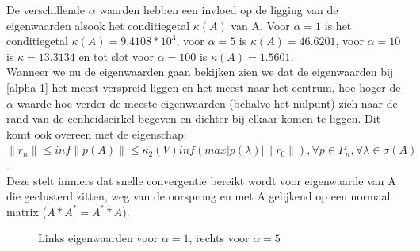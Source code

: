 De verschillende $\alpha$ waarden hebben een invloed op de ligging van de eigenwaarden alsook het conditiegetal $\kappa(A)$ van A. Voor $\alpha = 1$ is het conditiegetal $\kappa(A) = 9.4108*10^3$, voor $\alpha = 5$ is $\kappa(A) = 46.6201$, voor $\alpha = 10$ is $\kappa = 13.3134$ en tot slot voor $\alpha = 100$ is $\kappa(A) = 1.5601$.\\[12pt]

Wanneer we nu de eigenwaarden gaan bekijken zien we dat de eigenwaarden bij \ref{alpha 1} het meest verspreid liggen en het meest naar het centrum, hoe hoger de $\alpha$ waarde hoe verder de meeste eigenwaarden (behalve het nulpunt) zich naar de rand van de eenheidscirkel begeven en dichter bij elkaar komen te liggen. Dit komt ook overeen met de eigenschap: $\|r_{n}\| \leq inf\|p(A)\| \leq \kappa_{2}(V) inf (max |p(\lambda)|\|r_{0}\|),\forall p\in P_{n}, \forall\lambda\in \sigma(A)$.\\
 Deze stelt immers dat snelle convergentie bereikt wordt voor eigenwaarde van A die geclusterd zitten, weg van de oorsprong en met A gelijkend op een normaal matrix ($A*A^{*} = A^{*}*A$).

\begin{figure}[!tbp]
  \centering
  \hfill
  \caption{Links eigenwaarden voor $\alpha = 1$, rechts voor $\alpha = 5$}
\end{figure}

